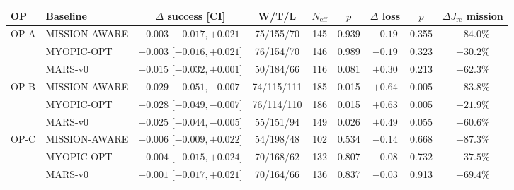 \begin{tabular}{llccccccc}
\toprule
OP & Baseline & $\Delta$ success [CI] & W/T/L & $N_{\mathrm{eff}}$ & $p$ & $\Delta$ loss & $p$ & $\Delta J_{\mathrm{rc}}$ mission\\
\midrule
OP-A & MISSION-AWARE & $+0.003$ [$-0.017, +0.021$] & 75/155/70 & 145 & 0.939 & $-0.19$ & 0.355 & $-84.0\%$\\
 & MYOPIC-OPT & $+0.003$ [$-0.016, +0.021$] & 76/154/70 & 146 & 0.989 & $-0.19$ & 0.323 & $-30.2\%$\\
 & MARS-v0 & $-0.015$ [$-0.032, +0.001$] & 50/184/66 & 116 & 0.081 & $+0.30$ & 0.213 & $-62.3\%$\\
\midrule
OP-B & MISSION-AWARE & $-0.029$ [$-0.051, -0.007$] & 74/115/111 & 185 & 0.015 & $+0.64$ & 0.005 & $-83.8\%$\\
 & MYOPIC-OPT & $-0.028$ [$-0.049, -0.007$] & 76/114/110 & 186 & 0.015 & $+0.63$ & 0.005 & $-21.9\%$\\
 & MARS-v0 & $-0.025$ [$-0.044, -0.005$] & 55/151/94 & 149 & 0.026 & $+0.49$ & 0.055 & $-60.6\%$\\
\midrule
OP-C & MISSION-AWARE & $+0.006$ [$-0.009, +0.022$] & 54/198/48 & 102 & 0.534 & $-0.14$ & 0.668 & $-87.3\%$\\
 & MYOPIC-OPT & $+0.004$ [$-0.015, +0.024$] & 70/168/62 & 132 & 0.807 & $-0.08$ & 0.732 & $-37.5\%$\\
 & MARS-v0 & $+0.001$ [$-0.017, +0.021$] & 70/164/66 & 136 & 0.837 & $-0.03$ & 0.913 & $-69.4\%$\\
\bottomrule
\end{tabular}
